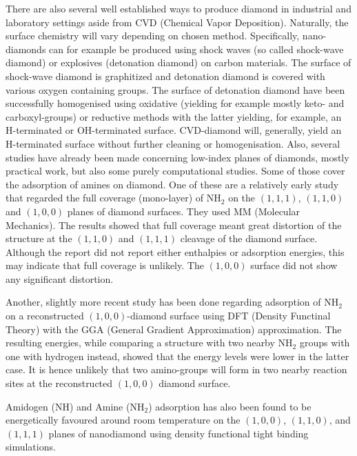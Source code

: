 \documentclass[10pt,a4paper]{article}
\begin{document}

There are also several well established ways to produce diamond in industrial and laboratory settings aside from CVD (Chemical Vapor Deposition). Naturally, the surface chemistry will vary depending on chosen method. Specifically, nano-diamonds can for example be produced using shock waves (so called shock-wave diamond) or explosives (detonation diamond) on carbon materials. The surface of shock-wave diamond is graphitized and detonation diamond is covered with various oxygen containing groups. The surface of detonation diamond have been successfully homogenised using oxidative (yielding for example mostly keto- and carboxyl-groups) or reductive methods with the latter yielding, for example, an H-terminated or OH-terminated surface. CVD-diamond will, generally, yield an H-terminated surface without further cleaning or homogenisation.\cite{ankekrueger2007} Also, several studies have already been made concerning low-index planes of diamonds, mostly practical work, but also some purely computational studies. Some of those cover the adsorption of amines on diamond.  One of these are a relatively early study that regarded the full coverage (mono-layer) of NH$_2$ on the $(1,  1, 1)$, $(1,  1,  0)$ and $(1,  0,  0)$ planes of diamond surfaces. They used MM (Molecular Mechanics). The results showed that full coverage meant great distortion of the structure at the $(1,  1,  0)$ and $(1,  1, 1)$ cleavage of the diamond surface. Although the report did not report either enthalpies or adsorption energies, this may indicate that full coverage is unlikely. The $(1,  0,  0)$ surface did not show any significant distortion. \cite{johnb.miller2001}

Another, slightly more recent study has been done regarding adsorption of NH$_2$ on a reconstructed $(1,  0,  0)$-diamond surface using DFT (Density Functinal Theory) with the GGA (General Gradient Approximation) approximation. The resulting energies, while comparing a structure with two nearby NH$_2$ groups with one with hydrogen instead, showed that the energy levels were lower in the latter case. It is hence unlikely that two amino-groups will form in two nearby reaction sites at the reconstructed $(1,  0,  0)$ diamond surface. \cite{yan.dong2010}

Amidogen (NH) and Amine (NH$_2$) adsorption has also been found to be energetically favoured around room temperature on the $(1,  0,  0)$, $(1,  1,  0)$, and $(1,  1, 1)$ planes of nanodiamond using density functional tight binding simulations.  \cite{lin.lai2011}
\end{document}

